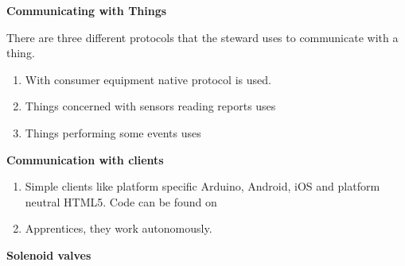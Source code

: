 \documentclass[16pt]{article}
\begin{document}
{\Large{\textbf{Communicating with
Things}}}


There are three different protocols that the steward uses to communicate
with a thing. 

\begin{enumerate}


\item With consumer equipment native protocol is used.
\item Things concerned with sensors reading reports uses
\item Things performing some events uses

\end{enumerate}

{\Large{\textbf{Communication with
clients}}}


\begin{enumerate}


\item
  Simple clients like platform specific Arduino, Android, iOS and
  platform neutral HTML5. Code can be found on
\item
  Apprentices, they work autonomously.
  
\end{enumerate}






\vspace{8.5cm}
{\textbf{\Large{Solenoid valves}}}

\hfill 
\end{document}
